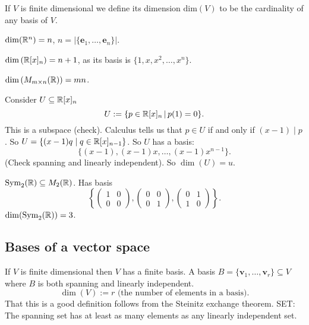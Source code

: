 \documentclass[10pt, a4paper]{article}
\newcommand{\mbf}[1]{\mathbf{#1}}
\begin{document}
\begin{definition}
    If $V$ is finite dimensional we define its dimension $\mathrm{dim}(V)$ to be the cardinality of any basis of $V$.
\end{definition}

\begin{example}
    $\dim(\mathbb{R} ^ n) = n$,
    $n = \left|\{\mbf{e}_1, \dotsc, \mbf{e}_n\}\right|$.

    $\dim{(\mathbb{R}[x]_n)} = n + 1$,
    as its basis is $\{1, x, x ^ 2, \dotsc, x ^ n\}$.

    $\dim{(M_{m \times n}(\mathbb{R}))} = mn$.

    Consider $U \subseteq \mathbb{R}[x]_n$
    \[
    U := \{p \in \mathbb{R}[x]_n\,|\,p(1) = 0\}.
    \]
    This is a subspace
    (check).
    Calculus tells us that $p \in U$ if and only if $(x - 1) \mid p$.
    So $U = \{(x - 1)q\mid q \in \mathbb{R}[x]_{n - 1}\}$.
    So $U$ has a basis:
    \[
    \{(x - 1), (x - 1)x, \dotsc, (x - 1)x ^ {n - 1}\}.
    \]
    (Check spanning and linearly independent).
    So $\dim(U) = u$.

    $\mathrm{Sym}_2(\mathbb{R}) \subseteq M_2(\mathbb{R})$.
    Has basis
    \[
    \left\{\begin{pmatrix}
        1 & 0 \\ 0 & 0
    \end{pmatrix}, \begin{pmatrix}
        0 & 0 \\ 0 & 1
    \end{pmatrix}, \begin{pmatrix}
        0 & 1 \\ 1 & 0
    \end{pmatrix}\right\}.
    \]
    $\dim(\mathrm{Sym}_2(\mathbb{R})) = 3$.
\end{example}

\subsection{Bases of a vector space}
If $V$ is finite dimensional then $V$ has a finite basis.
A basis $B = \{\mbf{v}_1, \dotsc, \mbf{v}_r\} \subseteq V$ where $B$ is both spanning and linearly independent.
\[
\dim(V) := r\text{ (the number of elements in a basis)}.
\]
That this is a good definition follows from the Steinitz exchange theorem.
SET:
The spanning set has at least as many elements as any linearly independent set.
\end{document}
